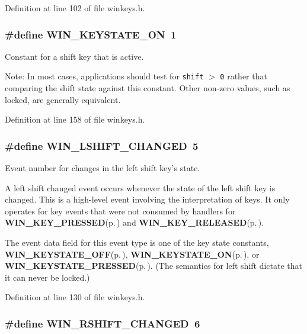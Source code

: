Definition at line 102 of file winkeys.h.
\subsubsection{\setlength{\rightskip}{0pt plus 5cm}\#define WIN\_\-KEYSTATE\_\-ON~1}\label{winkeys_8h_a7}


Constant for a shift key that is active. 

\begin{Desc}
\item[Note:]In most cases, applications should test for {\tt shift} {\tt $>$} {\tt 0} rather that comparing the shift state against this constant. Other non-zero values, such as locked, are generally equivalent. \end{Desc}


Definition at line 158 of file winkeys.h.
\subsubsection{\setlength{\rightskip}{0pt plus 5cm}\#define WIN\_\-LSHIFT\_\-CHANGED~5}\label{winkeys_8h_a4}


Event number for changes in the left shift key's state. 

A left shift changed event occurs whenever the state of the left shift key is changed. This is a high-level event involving the interpretation of keys. It only operates for key events that were not consumed by handlers for {\bf WIN\_\-KEY\_\-PRESSED}{\rm (p.\,\pageref{winkeys_8h_a0})} and {\bf WIN\_\-KEY\_\-RELEASED}{\rm (p.\,\pageref{winkeys_8h_a1})}.

The event data field for this event type is one of the key state constants, {\bf WIN\_\-KEYSTATE\_\-OFF}{\rm (p.\,\pageref{winkeys_8h_a6})}, {\bf WIN\_\-KEYSTATE\_\-ON}{\rm (p.\,\pageref{winkeys_8h_a7})}, or {\bf WIN\_\-KEYSTATE\_\-PRESSED}{\rm (p.\,\pageref{winkeys_8h_a9})}. (The semantics for left shift dictate that it can never be locked.) 

Definition at line 130 of file winkeys.h.
\subsubsection{\setlength{\rightskip}{0pt plus 5cm}\#define WIN\_\-RSHIFT\_\-CHANGED~6}\label{winkeys_8h_a5}


